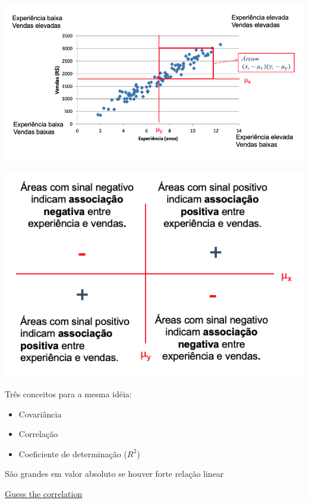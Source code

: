\documentclass[
  9pt,
  ignorenonframetext,
  aspectratio=169]{beamer}
\begin{document}
\begin{frame}{}
\protect\hypertarget{section-1}{}
\includegraphics{imgs/corr2.png}
\end{frame}

\begin{frame}{}
\protect\hypertarget{section-2}{}
\includegraphics{imgs/corr3.png}
\end{frame}

\begin{frame}{}
\protect\hypertarget{section-3}{}
Três conceitos para a mesma idéia:

\begin{itemize}
\item
  Covariância
\item
  Correlação
\item
  Coeficiente de determinação (\(R^{2}\))
\end{itemize}

São grandes em valor absoluto se houver forte relação linear

\href{http://guessthecorrelation.com/}{Guess the correlation}
\end{frame}
\end{document}
